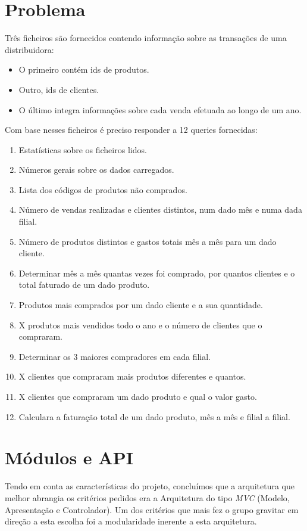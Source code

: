 \documentclass[a4paper]{report}
\begin{document}
\chapter{Problema}
Três ficheiros são fornecidos contendo informação sobre as transações de uma distribuidora:
\begin{itemize}
    \item O primeiro contém ids de produtos.
    \item Outro, ids de clientes.
    \item O último integra informações sobre cada venda efetuada ao longo de um ano. 
\end{itemize}
Com base nesses ficheiros é preciso responder a 12 queries fornecidas:
\begin{enumerate}
    \item Estatísticas sobre os ficheiros lidos.
    \item Números gerais sobre os dados carregados.
    \item Lista dos códigos de produtos não comprados.
    \item Número de vendas realizadas e clientes distintos, num dado mês e numa dada filial.
    \item Número de produtos distintos e gastos totais mês a mês para um dado cliente.
    \item Determinar mês a mês quantas vezes foi comprado, por quantos clientes e o total faturado de um dado produto.
    \item Produtos mais comprados por um dado cliente e a sua quantidade.
    \item X produtos mais vendidos todo o ano e o número de clientes que o compraram.
    \item Determinar os 3 maiores compradores em cada filial.
    \item X clientes que compraram mais produtos diferentes e quantos.
    \item X clientes que compraram um dado produto e qual o valor gasto.
    \item Calculara a faturação total de um dado produto, mês a mês e filial a filial.
\end{enumerate}

\chapter{Módulos e API}\label{chap:api}

Tendo em conta as características do projeto, concluímos que a arquitetura que melhor
abrangia os critérios pedidos era a Arquitetura do tipo \textit{MVC} (Modelo, 
Apresentação e Controlador).
Um dos critérios que mais fez o grupo gravitar em direção a esta escolha foi 
a modularidade inerente a esta arquitetura.
\end{document}
